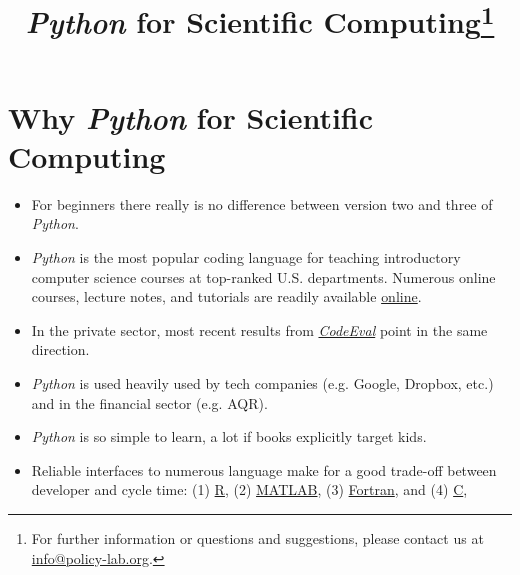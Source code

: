 
\title{\textit{Python} for Scientific Computing\thanks{For further information or questions and suggestions, please contact us at \href{mailto: info@policy-lab.org}{info@policy-lab.org}.}}
\author{ }
\date{ } 


\section{Why \textit{Python} for Scientific Computing}

\begin{itemize}
\item For beginners there really is no difference between version two and three of \textit{Python}.
\item \textit{Python} is the most popular coding language for teaching introductory computer science courses at top-ranked U.S. departments. Numerous online courses, lecture notes, and tutorials are readily available \href{http://www.fullstackpython.com/best-python-resources.html}{online}.
\item In the private sector, most recent results from \href{https://www.codeeval.com}{\textit{CodeEval}} point in the same direction.
\item \textit{Python} is used heavily used by tech companies (e.g. Google, Dropbox, etc.) and in the financial sector (e.g. AQR).
\item \textit{Python} is so simple to learn, a lot if books explicitly target kids. 
\item Reliable interfaces to numerous language make for a good trade-off between developer and cycle time: (1) \href{https://www.r-project.org}{R}, (2) \href{www.mathworks.com}{MATLAB}, (3) \href{https://en.wikipedia.org/wiki/Fortran}{Fortran}, and (4) \href{ttps://en.wikipedia.org/wiki/C_(programming_language}{C},
\end{itemize}

% 
%
%
%
%

